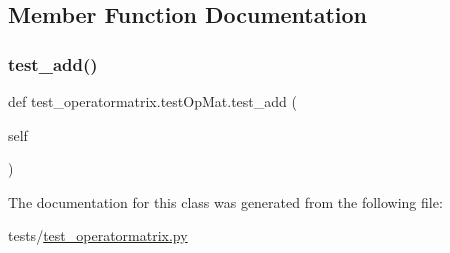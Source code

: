\subsection{Member Function Documentation}
\mbox{\label{classtest__operatormatrix_1_1testOpMat_a8123d8a83970cc4a0a7d90b5cbd05355}} 
\subsubsection{\texorpdfstring{test\+\_\+add()}{test\_add()}}
{\footnotesize\ttfamily def test\+\_\+operatormatrix.\+test\+Op\+Mat.\+test\+\_\+add (\begin{DoxyParamCaption}\item[{}]{self }\end{DoxyParamCaption})}



The documentation for this class was generated from the following file\+:\begin{DoxyCompactItemize}
\item 
tests/\hyperlink{test__operatormatrix_8py}{test\+\_\+operatormatrix.\+py}\end{DoxyCompactItemize}
